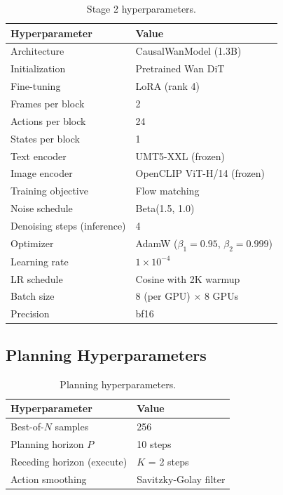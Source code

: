 \documentclass{article}
\begin{document}
\begin{table}[h]
\centering
\caption{Stage 2 hyperparameters.}
\label{tab:app_stage2}
\begin{tabular}{ll}
\toprule
\textbf{Hyperparameter} & \textbf{Value} \\
\midrule
Architecture & CausalWanModel (1.3B) \\
Initialization & Pretrained Wan DiT \\
Fine-tuning & LoRA (rank 4) \\
Frames per block & 2 \\
Actions per block & 24 \\
States per block & 1 \\
Text encoder & UMT5-XXL (frozen) \\
Image encoder & OpenCLIP ViT-H/14 (frozen) \\
Training objective & Flow matching \\
Noise schedule & Beta(1.5, 1.0) \\
Denoising steps (inference) & 4 \\
Optimizer & AdamW ($\beta_1 = 0.95$, $\beta_2 = 0.999$) \\
Learning rate & $1 \times 10^{-4}$ \\
LR schedule & Cosine with 2K warmup \\
Batch size & 8 (per GPU) $\times$ 8 GPUs \\
Precision & bf16 \\
\bottomrule
\end{tabular}
\end{table}

\subsection{Planning Hyperparameters}

\begin{table}[h]
\centering
\caption{Planning hyperparameters.}
\label{tab:app_planning}
\begin{tabular}{ll}
\toprule
\textbf{Hyperparameter} & \textbf{Value} \\
\midrule
Best-of-$N$ samples & 256 \\
Planning horizon $P$ & 10 steps \\
Receding horizon (execute) & $K$ = 2 steps \\
Action smoothing & Savitzky-Golay filter \\
\bottomrule
\end{tabular}
\end{table}
\end{document}
